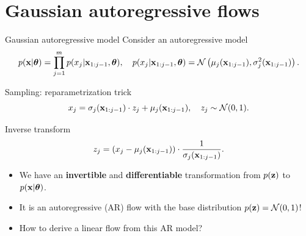 \section{Gaussian autoregressive flows}
\begin{frame}{Gaussian autoregressive model}
	Consider an autoregressive model
	\vspace{-0.3cm}
	{\small
		\[
		p(\mathbf{x} | \boldsymbol{\theta}) = \prod_{j=1}^m p(x_j | \mathbf{x}_{1:j - 1}, \boldsymbol{\theta}), \quad
		p(x_j | \mathbf{x}_{1:j - 1}, \boldsymbol{\theta}) = \mathcal{N} \left(\mu_j(\mathbf{x}_{1:j-1}), \sigma^2_j (\mathbf{x}_{1:j-1})\right).
		\]
	}
	\vspace{-0.5cm}
	\begin{block}{Sampling: reparametrization trick}
		\vspace{-0.3cm}
		\[
		x_j = \sigma_j (\mathbf{x}_{1:j-1}) \cdot z_j + \mu_j(\mathbf{x}_{1:j-1}), \quad z_j \sim \mathcal{N}(0, 1).
		\]
		\vspace{-0.7cm}
	\end{block}
	\begin{block}{Inverse transform}
		\vspace{-0.3cm}
		\[
		z_j = \left(x_j - \mu_j(\mathbf{x}_{1:j-1}) \right) \cdot \frac{1}{\sigma_j (\mathbf{x}_{1:j-1}) }.
		\]
		\vspace{-0.4cm}
	\end{block}
	\begin{itemize}
		\item We have an \textbf{invertible} and \textbf{differentiable} transformation from $p(\mathbf{z})$ to $p(\mathbf{x} | \boldsymbol{\theta})$.
		\item It is an autoregressive (AR) flow with the base distribution $p(\mathbf{z}) = \mathcal{N}(0, 1)$!
		\item How to derive a linear flow from this AR model?
	\end{itemize}
\end{frame}
